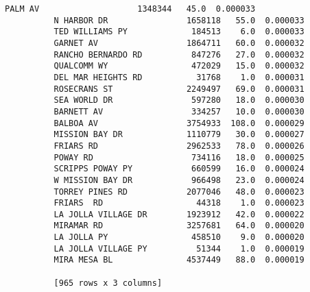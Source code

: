 \documentclass[11pt]{article}
\begin{document}
\begin{Verbatim}[commandchars=\\\{\}]
          PALM AV                    1348344   45.0  0.000033
          N HARBOR DR                1658118   55.0  0.000033
          TED WILLIAMS PY             184513    6.0  0.000033
          GARNET AV                  1864711   60.0  0.000032
          RANCHO BERNARDO RD          847276   27.0  0.000032
          QUALCOMM WY                 472029   15.0  0.000032
          DEL MAR HEIGHTS RD           31768    1.0  0.000031
          ROSECRANS ST               2249497   69.0  0.000031
          SEA WORLD DR                597280   18.0  0.000030
          BARNETT AV                  334257   10.0  0.000030
          BALBOA AV                  3754933  108.0  0.000029
          MISSION BAY DR             1110779   30.0  0.000027
          FRIARS RD                  2962533   78.0  0.000026
          POWAY RD                    734116   18.0  0.000025
          SCRIPPS POWAY PY            660599   16.0  0.000024
          W MISSION BAY DR            966498   23.0  0.000024
          TORREY PINES RD            2077046   48.0  0.000023
          FRIARS  RD                   44318    1.0  0.000023
          LA JOLLA VILLAGE DR        1923912   42.0  0.000022
          MIRAMAR RD                 3257681   64.0  0.000020
          LA JOLLA PY                 458510    9.0  0.000020
          LA JOLLA VILLAGE PY          51344    1.0  0.000019
          MIRA MESA BL               4537449   88.0  0.000019
          
          [965 rows x 3 columns]
\end{Verbatim}
            

    
    
    
    
\end{document}
